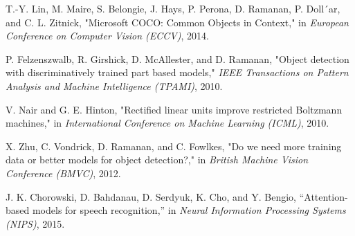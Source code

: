 \documentclass[conference]{IEEEtran}
\begin{document}
\begin{thebibliography}{00}
 T.-Y. Lin, M. Maire, S. Belongie, J. Hays, P. Perona, D. Ramanan, P. Doll´ar, and C. L. Zitnick, "Microsoft COCO: Common Objects in Context," in \textit{European Conference on Computer Vision (ECCV)}, 2014.

 P. Felzenszwalb, R. Girshick, D. McAllester, and D. Ramanan, "Object detection with discriminatively trained part based models," \textit{IEEE Transactions on Pattern Analysis and Machine Intelligence (TPAMI)}, 2010.

 V. Nair and G. E. Hinton, "Rectified linear units improve restricted Boltzmann machines," in \textit{International Conference on Machine Learning (ICML)}, 2010.

 X. Zhu, C. Vondrick, D. Ramanan, and C. Fowlkes, "Do we need more training data or better models for object detection?," in \textit{British Machine Vision Conference (BMVC)}, 2012.

 J. K. Chorowski, D. Bahdanau, D. Serdyuk, K. Cho, and
Y. Bengio, “Attention-based models for speech recognition,” in
\textit{Neural Information Processing Systems (NIPS)}, 2015.

\end{thebibliography}
\end{document}
